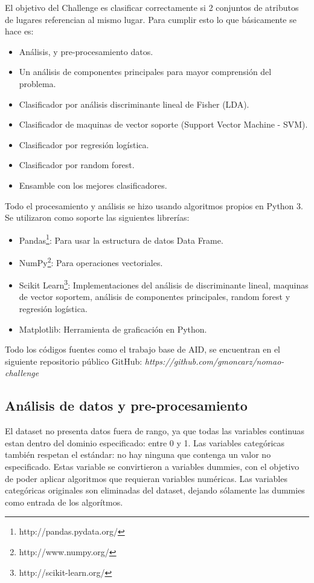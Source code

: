 \documentclass[journal]{IEEEtran}
\begin{document}
El objetivo del Challenge es clasificar correctamente si 2 conjuntos 
de atributos de lugares referencian al mismo lugar. Para cumplir esto lo que básicamente se hace es:
\begin{itemize}
\item Análisis, y pre-procesamiento datos. 
\item Un análisis de componentes principales para mayor comprensión del problema. 
\item Clasificador por análisis discriminante lineal de Fisher (LDA).
\item Clasificador de maquinas de vector soporte (Support Vector Machine - SVM).
\item Clasificador por regresión logística.
\item Clasificador por random forest.
\item Ensamble con los mejores clasificadores.
\end{itemize}

Todo el procesamiento y análisis se hizo usando algoritmos propios en Python 3. Se
utilizaron como soporte las siguientes librerías:
\begin{itemize}
\item Pandas\footnote{http://pandas.pydata.org/}: Para usar la estructura de datos Data Frame.
\item NumPy\footnote{http://www.numpy.org/}: Para operaciones vectoriales.
\item Scikit Learn\footnote{http://scikit-learn.org/}: Implementaciones del análisis 
	de discriminante lineal, maquinas de vector soportem, análisis
	de componentes principales, random forest y regresión logística.
\item Matplotlib: Herramienta de graficación en Python.
\end{itemize}

Todo los códigos fuentes como el trabajo base de AID,
se encuentran en el siguiente repositorio público GitHub: 
\textit{https://github.com/gmoncarz/nomao-challenge}

\subsection{Análisis de datos y pre-procesamiento}
El dataset no presenta datos fuera de rango, ya que todas las variables continuas estan
dentro del dominio especificado: entre 0 y 1. Las variables 
categóricas también respetan el estándar: no hay ninguna
que contenga un valor no especificado. Estas 
variable se convirtieron a variables dummies, con el objetivo 
de poder aplicar algoritmos que requieran variables numéricas. Las
variables categóricas originales son eliminadas del
dataset, dejando sólamente las dummies como entrada de los
algorítmos.
\end{document}
